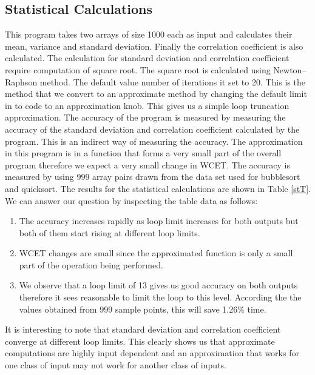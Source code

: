 \subsection{Statistical Calculations}
This program takes two arrays of size 1000 each as input and calculates their mean, variance and standard deviation. Finally the correlation coefficient is also calculated. The calculation for standard deviation and correlation coefficient require computation of square root. The square root is calculated using Newton–Raphson method. The default value number of iterations it set to 20. This is the method that we convert to an approximate method by changing the default limit in to code to an approximation knob. This gives us a simple loop truncation approximation. The accuracy of the program is measured by measuring the accuracy of the standard deviation and correlation coefficient calculated by the program. This is an indirect way of measuring the accuracy. The approximation in this program is in a function that forms a very small part of the overall program therefore we expect a very small change in WCET. The accuracy is measured by using 999 array pairs drawn from the data set used for bubblesort and quicksort. The results for the statistical calculations are shown in Table \ref{stT}.  We can answer our question by inspecting the table data as follows:



 \begin{enumerate}
 \item The accuracy increases rapidly as loop limit increases for both outputs but both of them start rising at different loop limits.
 \item WCET changes are small since the approximated function is only a small part of the operation being performed.
 \item We observe that a loop limit of 13 gives us good accuracy on both outputs therefore it sees reasonable to limit the loop to this level. According the the values obtained from 999 sample points, this will save 1.26\% time.
 \end{enumerate}

It is interesting to note that standard deviation and correlation coefficient converge at different loop limits. This clearly shows us that approximate computations are highly input dependent and an approximation that works for one class of input may not work for another class of inputs.

